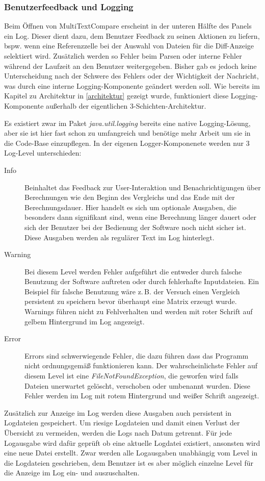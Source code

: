 \subsubsection{Benutzerfeedback und Logging}\label{logging}

Beim Öffnen von MultiTextCompare erscheint in der unteren Hälfte des Panels ein Log. Dieser dient dazu, dem Benutzer Feedback zu seinen Aktionen zu liefern, bspw. wenn eine Referenzzelle bei der Auswahl von Dateien für die Diff-Anzeige selektiert wird. Zusätzlich werden so Fehler beim Parsen oder interne Fehler während der Laufzeit an den Benutzer weitergegeben. Bisher gab es jedoch keine Unterscheidung nach der Schwere des Fehlers oder der Wichtigkeit der Nachricht, was durch eine interne Logging-Komponente geändert werden soll. Wie bereits im Kapitel zu Architektur in \ref{architektur} gezeigt wurde, funktioniert diese Logging-Komponente außerhalb der eigentlichen 3-Schichten-Architektur. 

Es existiert zwar im Paket \emph{java.util.logging} bereits eine native Logging-Lösung, aber sie ist hier fast schon zu umfangreich und benötige mehr Arbeit um sie in die Code-Base einzupflegen. In der eigenen Logger-Komponenete werden nur 3 Log-Level unterschieden: 
\begin{description}
\item[Info] Beinhaltet das Feedback zur User-Interaktion und Benachrichtigungen über Berechnungen wie den Beginn des Vergleichs und das Ende mit der Berechnungsdauer. Hier handelt es sich um optionale Ausgaben, die besonders dann signifikant sind, wenn eine Berechnung länger dauert oder sich der Benutzer bei der Bedienung der Software noch nicht sicher ist. Diese Ausgaben werden als regulärer Text im Log hinterlegt.

\item[Warning] Bei diesem Level werden Fehler aufgeführt die entweder durch falsche Benutzung der Software auftreten oder durch fehlerhafte Inputdateien. Ein Beispiel für falsche Benutzung wäre z.\,B. der Versuch einen Vergleich persistent zu speichern bevor überhaupt eine Matrix erzeugt wurde. Warnings führen nicht zu Fehlverhalten und werden mit roter Schrift auf gelbem Hintergrund im Log angezeigt.

\item[Error] Errors sind schwerwiegende Fehler, die dazu führen dass das Programm nicht ordnungsgemäß funktionieren kann. Der wahrscheinlichste Fehler auf diesem Level ist eine \emph{FileNotFoundException}, die geworfen wird falls Dateien unerwartet gelöscht, verschoben oder umbenannt wurden. Diese Fehler werden im Log mit rotem Hintergrund und weißer Schrift angezeigt.
\end{description}

Zusätzlich zur Anzeige im Log werden diese Ausgaben auch persistent in Logdateien gespeichert. Um riesige Logdateien und damit einen Verlust der Übersicht zu vermeiden, werden die Logs nach Datum getrennt. Für jede Logausgabe wird dafür geprüft ob eine aktuelle Logdatei existiert, ansonsten wird eine neue Datei erstellt. Zwar werden alle Logausgaben unabhängig vom Level in die Logdateien geschrieben, dem Benutzer ist es aber möglich einzelne Level für die Anzeige im Log ein- und auszuschalten.

